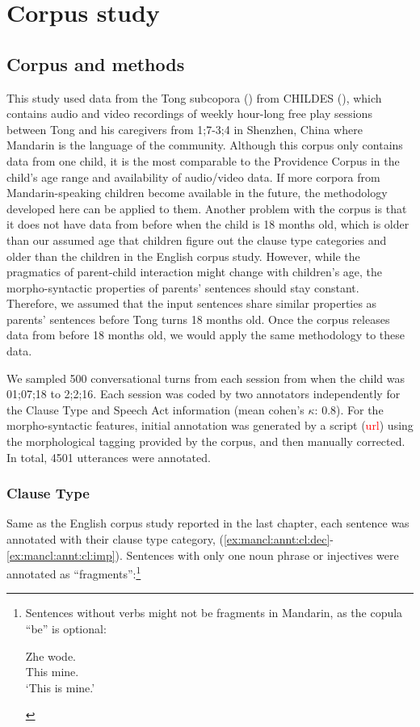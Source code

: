 \section{Corpus study}
\label{sec:mancl:corpus}

\subsection{Corpus and methods}
\label{sec:mancl:corpus:method}
This study used data from the Tong subcopora (\cite{TongCorpus}) from CHILDES (\cite{CHILDES}), which contains audio and video recordings of weekly hour-long free play sessions between Tong and his caregivers from 1;7-3;4 in Shenzhen, China where Mandarin is the language of the community. Although this corpus only contains data from one child, it is the most comparable to the Providence Corpus in the child’s age range and availability of audio/video data. If more corpora from Mandarin-speaking children become available in the future, the methodology developed here can be applied to them. Another problem with the corpus is that it does not have data from before when the child is 18 months old, which is older than our assumed age that children figure out the clause type categories and older than the children in the English corpus study. However, while the pragmatics of parent-child interaction might change with children's age, the morpho-syntactic properties of parents' sentences should stay constant. Therefore, we assumed that the input sentences share similar properties as parents' sentences before Tong turns 18 months old. Once the corpus releases data from before 18 months old, we would apply the same methodology to these data. 

We sampled 500 conversational turns from each session from when the child was 01;07;18 to 2;2;16. Each session was coded by two annotators independently for the Clause Type and Speech Act information (mean cohen's $\kappa$: 0.8). For the morpho-syntactic features, initial annotation was generated by a script (\textcolor{red}{url}) using the morphological tagging provided by the corpus, and then manually corrected. In total, 4501 utterances were annotated. 

\subsubsection{Clause Type}

Same as the English corpus study reported in the last chapter, each sentence was annotated with their clause type category, \diis{} (\ref{ex:mancl:annt:cl:dec}-\ref{ex:mancl:annt:cl:imp}). Sentences with only one noun phrase or injectives were annotated as ``fragments'':\footnote{Sentences without verbs might not be fragments in Mandarin, as the copula  ``be'' is optional:
\begin{xlist}
\ex 
\gll Zhe wode.\\
This mine.\\
\trans `This is mine.'
\end{xlist}
}

